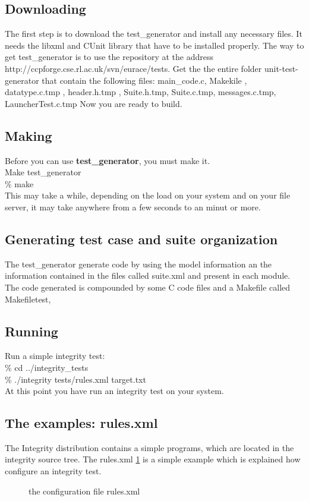 \documentclass[a4paper,10pt]{article}
\begin{document}
\subsection{Downloading}
The first step is to download the test\_generator and install any necessary files. 
It needs the  libxml and CUnit library that have to be installed properly.
The  way to get test\_generator is to use the repository at the address  http://ccpforge.cse.rl.ac.uk/svn/eurace/tests. 
Get the the entire folder unit-test-generator that contain the following files:
main\_code.c, Makekile , datatype.c.tmp , header.h.tmp , Suite.h.tmp,
Suite.c.tmp, messages.c.tmp, LauncherTest.c.tmp
Now you are ready to build.
\subsection{Making}
Before you can use \textbf{test\_generator}, you must make it. \\
Make test\_generator\\
\% make \\
This may take a while, depending on the load on your system and on your file server,
it may take anywhere from a few seconds to an minut or more.
\subsection{Generating test case and suite organization}
The test\_generator generate code by using the model information an the information contained in the files called suite.xml and present in each module. 
The code generated is compounded by some C code files and a Makefile called Makefiletest, 
\subsection{Running}
Run a simple integrity test:\\
\% cd ../integrity\_tests\\
\% ./integrity tests/rules.xml target.txt\\
At this point you have run an integrity test on your system. 
\subsection{The examples: rules.xml}
The Integrity distribution contains a simple programs, which are located in the
integrity source tree.
The rules.xml \ref{fig:fig1} is a simple example which is explained how configure an integrity test.
\begin{figure}
\label{fig:fig1}


\caption{the configuration file rules.xml}
\end{figure}
\end{document}
